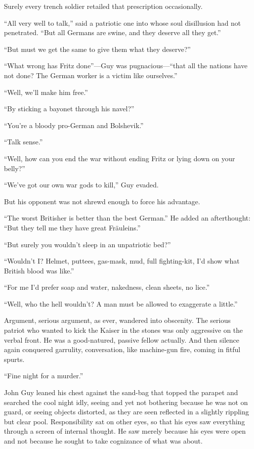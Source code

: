 Surely every trench soldier retailed that prescription occasionally.

``All very well to talk,'' said a patriotic one into whose soul disillusion had not penetrated. ``But all Germans are swine, and they deserve all they get.''

``But must we get the same to give them what they deserve?''

``What wrong has Fritz done''---Guy was pugnacious---``that all the nations have not done? The German worker is a victim like ourselves.''

``Well, we'll make him free.''

``By sticking a bayonet through his navel?''

``You're a bloody pro-German and Bolshevik.''

``Talk sense.''

``Well, how can you end the war without ending Fritz or lying down on your belly?''

``We've got our own war gods to kill,'' Guy evaded.

But his opponent was not shrewd enough to force his advantage.

``The worst Britisher is better than the best German.'' He added an afterthought: ``But they tell me they have great Fr\"{a}uleins.''

``But surely you wouldn't sleep in an unpatriotic bed?''

``Wouldn't I? Helmet, puttees, gas-mask, mud, full fighting-kit, I'd show what British blood was like.''

``For me I'd prefer soap and water, nakedness, clean sheets, no lice.''

``Well, who the hell wouldn't? A man must be allowed to exaggerate a little.''

Argument, serious argument, as ever, wandered into obscenity. The serious patriot who wanted to kick the Kaiser in the stones was only aggressive on the verbal front. He was a good-natured, passive fellow actually. And then silence again conquered garrulity, conversation, like machine-gun fire, coming in fitful spurts.

``Fine night for a murder.''

John Guy leaned his chest against the sand-bag that topped the parapet and searched the cool night idly, seeing and yet not bothering because he was not on guard, or seeing objects distorted, as they are seen reflected in a slightly rippling but clear pool. Responsibility sat on other eyes, so that his eyes saw everything through a screen of internal thought. He saw merely because his eyes were open and not because he sought to take cognizance of what was about.

